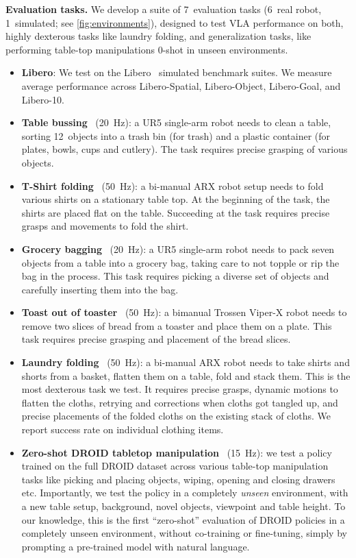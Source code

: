 \noindent\textbf{Evaluation tasks.}
We develop a suite of 7~evaluation tasks (6~real robot, 1~simulated; see \cref{fig:environments}), designed to test VLA performance on both, highly dexterous tasks like laundry folding, and generalization tasks, like performing table-top manipulations 0-shot in unseen environments.
\begin{itemize}
    \item \textbf{Libero}: We test on the Libero~\citep{liu2024libero} simulated benchmark suites. We measure average performance across Libero-Spatial, Libero-Object, Libero-Goal, and Libero-10. 
    \item\textbf{Table bussing}~\citep{black2024pi_0} (20~Hz): a UR5 single-arm robot needs to clean a table, sorting 12~objects into a trash bin (for trash) and a plastic container (for plates, bowls, cups and cutlery). The task requires precise grasping of various objects.
    \item\textbf{T-Shirt folding}~\citep{black2024pi_0} (50~Hz): a bi-manual ARX robot setup needs to fold various shirts on a stationary table top. At the beginning of the task, the shirts are placed flat on the table. Succeeding at the task requires precise grasps and movements to fold the shirt.
    \item\textbf{Grocery bagging}~\citep{black2024pi_0} (20~Hz): a UR5 single-arm robot needs to pack seven objects from a table into a grocery bag, taking care to not topple or rip the bag in the process. This task requires picking a diverse set of objects and carefully inserting them into the bag.
    \item\textbf{Toast out of toaster}~\citep{black2024pi_0} (50~Hz): a bimanual Trossen Viper-X robot needs to remove two slices of bread from a toaster and place them on a plate. This task requires precise grasping and placement of the bread slices.
    \item\textbf{Laundry folding}~\citep{black2024pi_0} (50~Hz): a bi-manual ARX robot needs to take shirts and shorts from a basket, flatten them on a table, fold and stack them. This is the most dexterous task we test. It requires precise grasps, dynamic motions to flatten the cloths, retrying and corrections when cloths got tangled up, and precise placements of the folded cloths on the existing stack of cloths. We report success rate on individual clothing items.
    \item\textbf{Zero-shot DROID tabletop manipulation}~\citep{khazatsky2024droid} (15~Hz): we test a policy trained on the full DROID dataset across various table-top manipulation tasks like picking and placing objects, wiping, opening and closing drawers etc. Importantly, we test the policy in a completely \emph{unseen} environment, with a new table setup, background, novel objects, viewpoint and table height. To our knowledge, this is the first ``zero-shot'' evaluation of DROID policies in a completely unseen environment, without co-training or fine-tuning, simply by prompting a pre-trained model with natural language.
\end{itemize}
